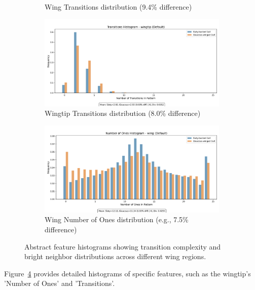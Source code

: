 \documentclass[a4paper,12pt]{report}
\begin{document}
\begin{figure}[htbp]
\begin{subfigure}[b]{0.49\textwidth}
        \caption{Wing Transitions distribution (9.4\% difference)}
        \label{fig:wing_transitions}
    \end{subfigure}
    \vspace{2mm}
    \begin{subfigure}[b]{0.49\textwidth}
        \includegraphics[width=\textwidth]{images/LBP/default_wingtip_transitions_histogram.png}
        \caption{Wingtip Transitions distribution (8.0\% difference)}
        \label{fig:wingtip_transitions}
    \end{subfigure}
    \hfill
    \begin{subfigure}[b]{0.49\textwidth}
        \includegraphics[width=\textwidth]{images/LBP/default_wing_ones_histogram.png}
        \caption{Wing Number of Ones distribution (e.g., 7.5\% difference)}
        \label{fig:wing_ones}
    \end{subfigure}
    \caption{Abstract feature histograms showing transition complexity and bright neighbor distributions across different wing regions.}
    \label{fig:feature_histograms}
\end{figure}


Figure~\ref{fig:feature_histograms} provides detailed histograms of specific features, such as the wingtip's 'Number of Ones' and 'Transitions'.
\end{document}
